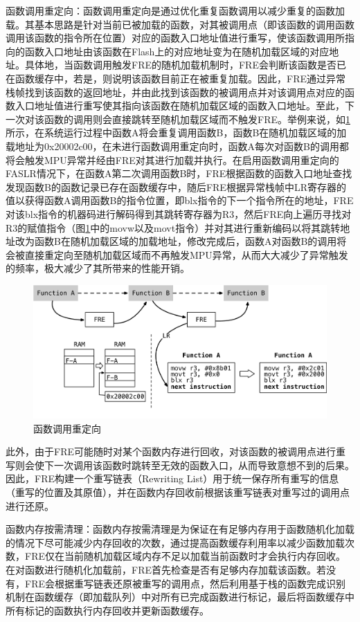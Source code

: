\documentclass[UTF8,12pt,a4paper]{ctexart}
\numberwithin{figure}{section}
\begin{document}
\par 函数调用重定向：函数调用重定向是通过优化重复函数调用以减少重复的函数加载。其基本思路是针对当前已被加载的函数，对其被调用点（即该函数的调用函数调用该函数的指令所在位置）对应的函数入口地址值进行重写，使该函数调用所指向的函数入口地址由该函数在Flash上的对应地址变为在随机加载区域的对应地址。具体地，当函数调用触发FRE的随机加载机制时，FRE会判断该函数是否已在函数缓存中，若是，则说明该函数目前正在被重复加载。因此，FRE通过异常栈帧找到该函数的返回地址，并由此找到该函数的被调用点并对该调用点对应的函数入口地址值进行重写使其指向该函数在随机加载区域的函数入口地址。至此，下一次对该函数的调用则会直接跳转至随机加载区域而不触发FRE。举例来说，如\ref{fig:redirection}所示，在系统运行过程中函数A将会重复调用函数B，函数B在随机加载区域的加载地址为0x20002c00，在未进行函数调用重定向时，函数A每次对函数B的调用都将会触发MPU异常并经由FRE对其进行加载并执行。在启用函数调用重定向的FASLR情况下，在函数A第二次调用函数B时，FRE根据函数的函数入口地址查找发现函数B的函数记录已存在函数缓存中，随后FRE根据异常栈帧中LR寄存器的值以获得函数A调用函数B的指令位置，即blx指令的下一个指令所在的地址，FRE对该blx指令的机器码进行解码得到其跳转寄存器为R3，然后FRE向上遍历寻找对R3的赋值指令（图\ref{fig:redirection}中的movw以及movt指令）并对其进行重新编码以将其跳转地址改为函数B在随机加载区域的加载地址，修改完成后，函数A对函数B的调用将会被直接重定向至随机加载区域而不再触发MPU异常，从而大大减少了异常触发的频率，极大减少了其所带来的性能开销。
\begin{figure}[H]
    \centering
    \includegraphics[scale=0.5]{graph/redirection.png}
    \caption{函数调用重定向}
    \label{fig:redirection}
\end{figure}
\par 此外，由于FRE可能随时对某个函数内存进行回收，对该函数的被调用点进行重写则会使下一次调用该函数时跳转至无效的函数入口，从而导致意想不到的后果。因此，FRE构建一个重写链表（Rewriting List）用于统一保存所有重写的信息（重写的位置及其原值），并在函数内存回收前根据该重写链表对重写过的调用点进行还原。
\par 函数内存按需清理：函数内存按需清理是为保证在有足够内存用于函数随机化加载的情况下尽可能减少内存回收的次数，通过提高函数缓存利用率以减少函数加载次数，FRE仅在当前随机加载区域内存不足以加载当前函数时才会执行内存回收。在对函数进行随机化加载前，FRE首先检查是否有足够内存加载该函数。若没有，FRE会根据重写链表还原被重写的调用点，然后利用基于栈的函数完成识别机制在函数缓存（即加载队列）中对所有已完成函数进行标记，最后将函数缓存中所有标记的函数执行内存回收并更新函数缓存。
\end{document}
